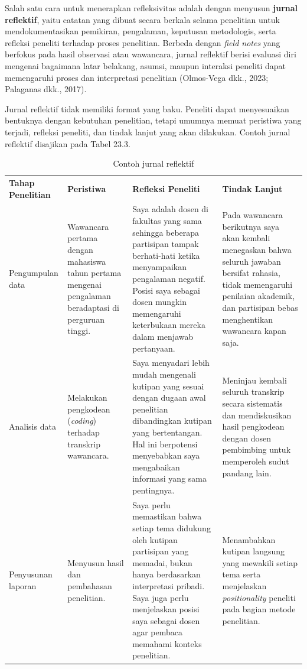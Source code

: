 \documentclass[
  indonesian,
  letterpaper,
  DIV=11,
  numbers=noendperiod]{scrreprt}
\begin{document}
Salah satu cara untuk menerapkan refleksivitas adalah dengan menyusun
\textbf{jurnal reflektif}, yaitu catatan yang dibuat secara berkala
selama penelitian untuk mendokumentasikan pemikiran, pengalaman,
keputusan metodologis, serta refleksi peneliti terhadap proses
penelitian. Berbeda dengan \emph{field notes} yang berfokus pada hasil
observasi atau wawancara, jurnal reflektif berisi evaluasi diri mengenai
bagaimana latar belakang, asumsi, maupun interaksi peneliti dapat
memengaruhi proses dan interpretasi penelitian (Olmos-Vega dkk., 2023;
Palaganas dkk., 2017).

Jurnal reflektif tidak memiliki format yang baku. Peneliti dapat
menyesuaikan bentuknya dengan kebutuhan penelitian, tetapi umumnya
memuat peristiwa yang terjadi, refleksi peneliti, dan tindak lanjut yang
akan dilakukan. Contoh jurnal reflektif disajikan pada Tabel 23.3.

\begin{longtable}[]{@{}
  >{\raggedright\arraybackslash}p{}
  >{\raggedright\arraybackslash}p{}
  >{\raggedright\arraybackslash}p{}
  >{\raggedright\arraybackslash}p{}@{}}
\caption{Contoh jurnal reflektif}\label{tbl-jurnal}\tabularnewline
\toprule\noalign{}
\endfirsthead
\endhead
\bottomrule\noalign{}
\endlastfoot
\textbf{Tahap Penelitian} & \textbf{Peristiwa} & \textbf{Refleksi
Peneliti} & \textbf{Tindak Lanjut} \\
Pengumpulan data & Wawancara pertama dengan mahasiswa tahun pertama
mengenai pengalaman beradaptasi di perguruan tinggi. & Saya adalah dosen
di fakultas yang sama sehingga beberapa partisipan tampak berhati-hati
ketika menyampaikan pengalaman negatif. Posisi saya sebagai dosen
mungkin memengaruhi keterbukaan mereka dalam menjawab pertanyaan. & Pada
wawancara berikutnya saya akan kembali menegaskan bahwa seluruh jawaban
bersifat rahasia, tidak memengaruhi penilaian akademik, dan partisipan
bebas menghentikan wawancara kapan saja. \\
Analisis data & Melakukan pengkodean (\emph{coding}) terhadap transkrip
wawancara. & Saya menyadari lebih mudah mengenali kutipan yang sesuai
dengan dugaan awal penelitian dibandingkan kutipan yang bertentangan.
Hal ini berpotensi menyebabkan saya mengabaikan informasi yang sama
pentingnya. & Meninjau kembali seluruh transkrip secara sistematis dan
mendiskusikan hasil pengkodean dengan dosen pembimbing untuk memperoleh
sudut pandang lain. \\
Penyusunan laporan & Menyusun hasil dan pembahasan penelitian. & Saya
perlu memastikan bahwa setiap tema didukung oleh kutipan partisipan yang
memadai, bukan hanya berdasarkan interpretasi pribadi. Saya juga perlu
menjelaskan posisi saya sebagai dosen agar pembaca memahami konteks
penelitian. & Menambahkan kutipan langsung yang mewakili setiap tema
serta menjelaskan \emph{positionality} peneliti pada bagian metode
penelitian. \\
\end{longtable}
\end{document}
